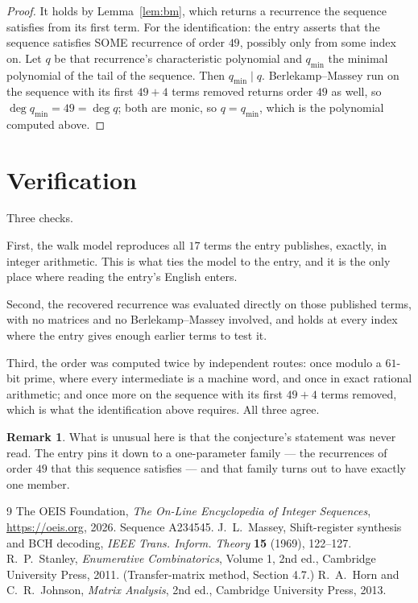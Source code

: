 \documentclass[11pt,a4paper]{article}
\theoremstyle{plain}
\theoremstyle{definition}
\newtheorem{remark}[theorem]{Remark}
\begin{document}
\begin{proof}
It holds by Lemma~\ref{lem:bm}, which returns a recurrence the sequence satisfies from its
first term. For the identification: the entry asserts that the sequence satisfies SOME
recurrence of order $49$, possibly only from some index on. Let $q$ be that recurrence's
characteristic polynomial and $q_{\min}$ the minimal polynomial of the tail of the sequence.
Then $q_{\min}\mid q$. Berlekamp--Massey run on the sequence with its first $49+4$ terms
removed returns order $49$ as well, so $\deg q_{\min}=49=\deg q$; both are monic, so
$q=q_{\min}$, which is the polynomial computed above.
\end{proof}

\section{Verification}

Three checks.

First, the walk model reproduces all $17$ terms the entry publishes, exactly, in integer
arithmetic. This is what ties the model to the entry, and it is the only place where reading
the entry's English enters.

Second, the recovered recurrence was evaluated directly on those published terms, with no
matrices and no Berlekamp--Massey involved, and holds at every index where the entry gives
enough earlier terms to test it.

Third, the order was computed twice by independent routes: once modulo a $61$-bit prime, where
every intermediate is a machine word, and once in exact rational arithmetic; and once more on
the sequence with its first $49+4$ terms removed, which is what the identification above
requires. All three agree.

\begin{remark}
What is unusual here is that the conjecture's statement was never read. The entry pins it down
to a one-parameter family --- the recurrences of order $49$ that this sequence satisfies
--- and that family turns out to have exactly one member.
\end{remark}

\begin{thebibliography}{9}
 The OEIS Foundation, \emph{The On-Line Encyclopedia of Integer
Sequences}, \url{https://oeis.org}, 2026. Sequence A234545.
 J.~L.~Massey, Shift-register synthesis and BCH decoding, \emph{IEEE
Trans. Inform. Theory} \textbf{15} (1969), 122--127.
 R.~P.~Stanley, \emph{Enumerative Combinatorics}, Volume 1, 2nd ed.,
Cambridge University Press, 2011. (Transfer-matrix method, Section 4.7.)
 R.~A.~Horn and C.~R.~Johnson, \emph{Matrix Analysis}, 2nd ed., Cambridge
University Press, 2013.
\end{thebibliography}
\end{document}
